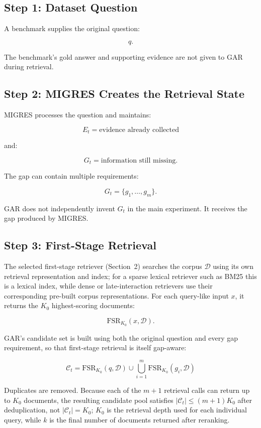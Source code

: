 \documentclass[11pt,a4paper]{article}
\begin{document}
\subsection{Step 1: Dataset Question}

A benchmark supplies the original question:

\[
q.
\]

The benchmark's gold answer and supporting evidence are not given to GAR during retrieval.

\subsection{Step 2: MIGRES Creates the Retrieval State}

MIGRES processes the question and maintains:

\[
E_t=\text{evidence already collected}
\]

and:

\[
G_t=\text{information still missing}.
\]

The gap can contain multiple requirements:

\[
G_t=\{g_1,\ldots,g_m\}.
\]

GAR does not independently invent $G_t$ in the main experiment. It receives the gap produced by MIGRES.

\subsection{Step 3: First-Stage Retrieval}

The selected first-stage retriever (Section~2) searches the corpus $\mathcal{D}$ using its own retrieval representation and index; for a sparse lexical retriever such as BM25 this is a lexical index, while dense or late-interaction retrievers use their corresponding pre-built corpus representations. For each query-like input $x$, it returns the $K_0$ highest-scoring documents:

\[
\mathrm{FSR}_{K_0}(x,\mathcal{D}).
\]

GAR's candidate set is built using both the original question and every gap requirement, so that first-stage retrieval is itself gap-aware:

\[
\boxed{
\mathcal{C}_t
=
\mathrm{FSR}_{K_0}(q,\mathcal{D})
\cup
\bigcup_{i=1}^{m}
\mathrm{FSR}_{K_0}(g_i,\mathcal{D})
}
\tag{9}
\]

Duplicates are removed. Because each of the $m+1$ retrieval calls can return up to $K_0$ documents, the resulting candidate pool satisfies $|\mathcal{C}_t|\le(m+1)K_0$ after deduplication, not $|\mathcal{C}_t|=K_0$; $K_0$ is the retrieval depth used for each individual query, while $k$ is the final number of documents returned after reranking.
\end{document}
